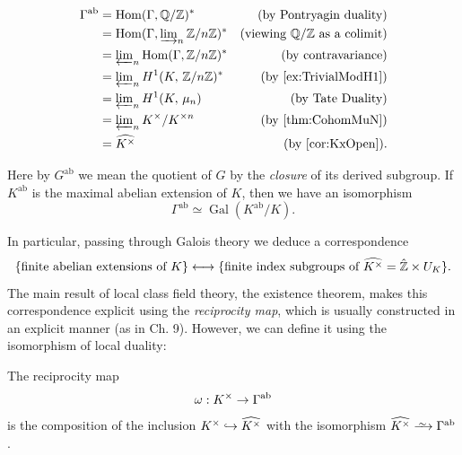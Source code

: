 \documentclass[a4paper, oneside]{memoir}
\begin{document}
\begin{align*}
    \Gamma^{\text{ab}} & = \operatorname{Hom}(\Gamma, \mathbb{Q}/\mathbb{Z})^*                              & \text{(by Pontryagin duality)}        \\
                       & = \operatorname{Hom}(\Gamma, \varinjlim_n\nolimits \mathbb{Z}/n\mathbb{Z})^*          & \text{(viewing $\mathbb{Q}/\mathbb{Z}$ as a colimit)} \\
                       & = \varprojlim_n\nolimits \operatorname{Hom}(\Gamma, \mathbb{Z}/n\mathbb{Z})^*         & \text{(by contravariance)}            \\
                       & = \varprojlim_n\nolimits H^{1}( K, \, \mathbb{Z}/n\mathbb{Z} )^*             & \text{(by \ref{ex:TrivialModH1})}     \\
                       & = \varprojlim_n\nolimits H^{1}( K, \, \mu_n )             & \text{(by Tate Duality)}              \\
                       & = \varprojlim_n\nolimits K^{\times} / K^{\times n} & \text{(by \ref{thm:CohomMuN})}        \\
                       & = \widehat{K^\times}                                & \text{(by \ref{cor:KxOpen})}.
\end{align*}

\begin{remark}
    Here by $G^{\text{ab}}$ we mean the quotient of $G$ by the \textit{closure} of its derived subgroup. If $K^{\text{ab}}$ is the maximal abelian extension of $K$, then we have an isomorphism
    \[
        \Gamma^{\text{ab}} \simeq \operatorname{Gal}(K^{\text{ab}}/K).
    \]
\end{remark}
In particular, passing through Galois theory we deduce a correspondence
\begin{equation}\label{eq:ClassField}
    \{\text{finite abelian extensions of }K\} \longleftrightarrow \{\text{finite index subgroups of }\widehat{K^\times} = \hat{\mathbb{Z}} \times U_K\}
    .\end{equation}
The main result of local class field theory, the existence theorem, makes this correspondence explicit using the \textit{reciprocity map}, which is usually constructed in an explicit manner (as in \cite{Harari} Ch. 9). However, we can define it using the isomorphism of local duality:

\begin{definition}
    The reciprocity map
    \[
        \omega:K^\times \to \Gamma^{\text{ab}}
    \]
    is the composition of the inclusion $K^\times \hookrightarrow \widehat{K^\times}$ with the isomorphism $\widehat{\K^\times} \Iso \Gamma^{\text{ab}}$.
\end{definition}
\end{document}

